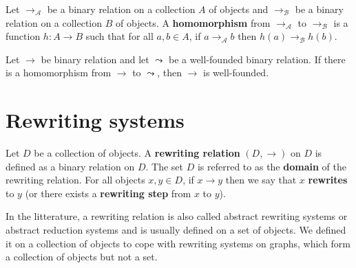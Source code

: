 \documentclass{book}
\begin{document}
  \begin{definition}
    \label{def:binary_relation:homomorphism}
    Let $\to_\mathcal{A}$ be a binary relation on a collection $A$ of objects and $\to_\mathcal{B}$ be a binary relation on a collection $B$ of objects. A \textbf{homomorphism} from $\to_\mathcal{A}$ to $\to_\mathcal{B}$ is a function \( h: A \mathop{\to} B \) such that for all \( a, b \mathop{\in} A \), if \( a \mathop{\to} _\mathcal{A} b \) then \( h(a) \mathop{\to} _\mathcal{B} h(b) \).
  \end{definition}
  
\begin{proposition}
  \label{prop:binary_relation:proving_well_foundedness}
  Let \(\to\) be binary relation and let $\leadsto$ be a well-founded binary relation. If there is a homomorphism from \(\to\) to \(\leadsto\), then \(\to\) is well-founded.
\end{proposition}
  

\chapter{Rewriting systems}
    \label{sec:category_of_rewriting_systems}      
      \begin{definition}
        \label{def:ars}
        Let $D$ be a collection of objects.  
        A \textbf{rewriting relation} $(D, \rightarrow)$ on $D$ is defined as a binary relation on $D$.  
        The set $D$ is referred to as the \textbf{domain} of the rewriting relation.  
        For all objects $x, y \mathop{\in} D$, if $x \mathop{\rightarrow} y$ then we say that $x$ \textbf{rewrites} to $y$ (or there exists a \textbf{rewriting step} from $x$ to $y$).
    \end{definition}

      In the litterature, a rewriting relation is also called abstract rewriting systems or abstract reduction systems \cite{nipkow1998term,terese2003term} and is usually defined on a set of objects. We defined it on a collection of objects to cope with rewriting systems on graphs, which form a collection of objects but not a set.
       
\end{document}
